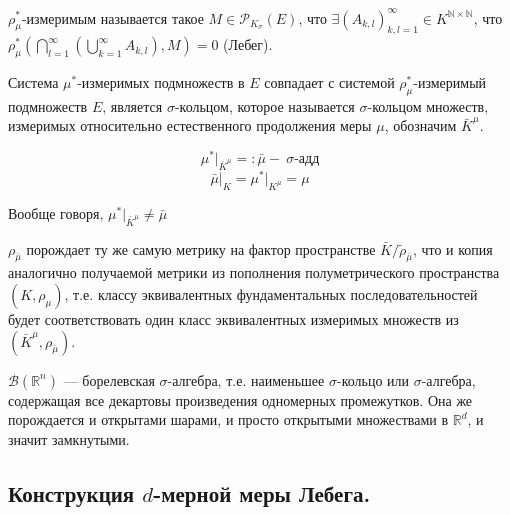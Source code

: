 \documentclass[a4paper, 12pt]{article}
\begin{document}
\begin{definition}
    $\rho_{\mu}^*$-измеримым называется такое $M \in \mathcal{P}_{K_{\sigma}}(E)$, что $\exists (A_{k,l})_{k,l = 1}^{\infty} \in K^{\mathbb{N} \times \mathbb{N}}$, что $\rho_{\mu}^*\left(\bigcap \limits_{l=1}^{\infty}\left(\bigcup \limits_{k = 1}^{\infty} A_{k,l} \right), M\right) = 0$ (Лебег).
\end{definition}

\begin{problem}[*]
    Система $\mu^*$-измеримых подмножеств в $E$ совпадает с системой $\rho^*_{\mu}$-измеримый подмножеств $E$, является $\sigma$-кольцом, которое называется $\sigma$-кольцом множеств, измеримых относительно естественного продолжения меры $\mu$, обозначим $\bar{K}^{\mu}$.

    $$ \mu^* \big|_{\bar{K}^{\mu}} =: \bar{\mu} - ~\text{$\sigma$-адд}$$
    $$ \bar{\mu} \big|_{K} = \mu^* \big|_{K^{\mu}} = \mu$$
\end{problem}

\begin{remark}
    Вообще говоря, $\mu^* \big|_{\bar{K}^{\mu}} \neq \bar{\mu}$
\end{remark}

\begin{remark}
   $\rho_{\bar{\mu}}$ порождает ту же самую метрику на фактор пространстве $\bar{K}/\tilde{\rho}_{\bar{\mu}}$, что и копия аналогично получаемой метрики из пополнения полуметрического пространства $(K, \rho_{\mu})$, т.е. классу эквивалентных фундаментальных последовательностей будет соответствовать один класс эквивалентных измеримых множеств из $(\bar{K}^{\mu}, \rho_{\bar{\mu}})$.
\end{remark}

\begin{designation}
    $\mathscr{B}(\mathbb{R}^n)$ --- борелевская $\sigma$-алгебра, т.е. наименьшее $\sigma$-кольцо или $\sigma$-алгебра, содержащая все декартовы произведения одномерных промежутков. Она же порождается и открытами шарами, и просто открытыми множествами в $\mathbb{R}^d$, и значит замкнутыми.
\end{designation}


\subsection*{Конструкция $d$-мерной меры Лебега.}
\end{document}
